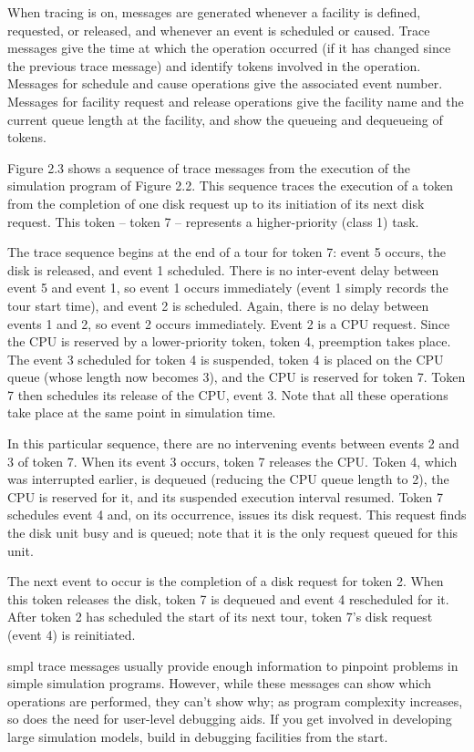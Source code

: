 When tracing is on, messages are generated whenever a facility is defined,
requested, or released, and whenever an event is scheduled or caused. Trace
messages give the time at which the operation occurred (if it has changed
since the previous trace message) and identify tokens involved in the
operation. Messages for schedule and cause operations give the associated
event number. Messages for facility request and release operations give the
facility name and the current queue length at the facility, and show the
queueing and dequeueing of tokens.

Figure 2.3 shows a sequence of trace messages from the execution of the
simulation program of Figure 2.2. This sequence traces the execution of a
token from the completion of one disk request up to its initiation of its next
disk request. This token -- token 7 -- represents a higher-priority (class 1)
task.

The trace sequence begins at the end of a tour for token 7: event 5 occurs, the
disk is released, and event 1 scheduled. There is no inter-event delay between
event 5 and event 1, so event 1 occurs immediately (event 1 simply records the
tour start time), and event 2 is scheduled. Again, there is no delay between
events 1 and 2, so event 2 occurs immediately. Event 2 is a CPU request. Since
the CPU is reserved by a lower-priority token, token 4, preemption takes
place. The event 3 scheduled for token 4 is suspended, token 4 is placed on
the CPU queue (whose length now becomes 3), and the CPU is reserved for token
7. Token 7 then schedules its release of the CPU, event 3. Note that all these
operations take place at the same point in simulation time.

In this particular sequence, there are no intervening events between events 2
and 3 of token 7. When its event 3 occurs, token 7 releases the CPU. Token 4,
which was interrupted earlier, is dequeued (reducing the CPU queue length to
2), the CPU is reserved for it, and its suspended execution interval resumed.
Token 7 schedules event 4 and, on its occurrence, issues its disk request. This
request finds the disk unit busy and is queued; note that it is the only
request queued for this unit.

The next event to occur is the completion of a disk request for token 2. When
this token releases the disk, token 7 is dequeued and event 4 rescheduled for
it. After token 2 has scheduled the start of its next tour, token 7's disk
request (event 4) is reinitiated.

smpl trace messages usually provide enough information to pinpoint problems in
simple simulation programs. However, while these messages can show which
operations are performed, they can't show why; as program
\noindent complexity increases, so does the need for user-level debugging aids. If you get involved
in developing large simulation models, build in debugging facilities from the
start.

